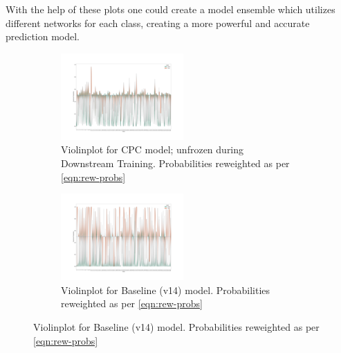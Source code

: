 With the help of these plots one could create a model ensemble which utilizes different networks for each class, creating a more powerful and accurate prediction model.
\begin{figure}[H]	
	\begin{subfigure}[t]{1\textwidth}\centering
		\includegraphics[width=1\linewidth]{bilder/cpc-probdistribution-unfrozen-reweighted-width.png}
		\caption{Violinplot for CPC model; unfrozen during Downstream Training. Probabilities reweighted as per \autoref{eqn:rew-probs}}
	\end{subfigure}
	\begin{subfigure}[t]{1\textwidth}\centering
		\includegraphics[width=1\linewidth]{bilder/bl-probdistribution-reweighted-width.png}
		\caption{Violinplot for Baseline (v14) model. Probabilities reweighted as per \autoref{eqn:rew-probs}}
	\end{subfigure}%
\label{fig:violinplot-reweight}
\end{figure}

